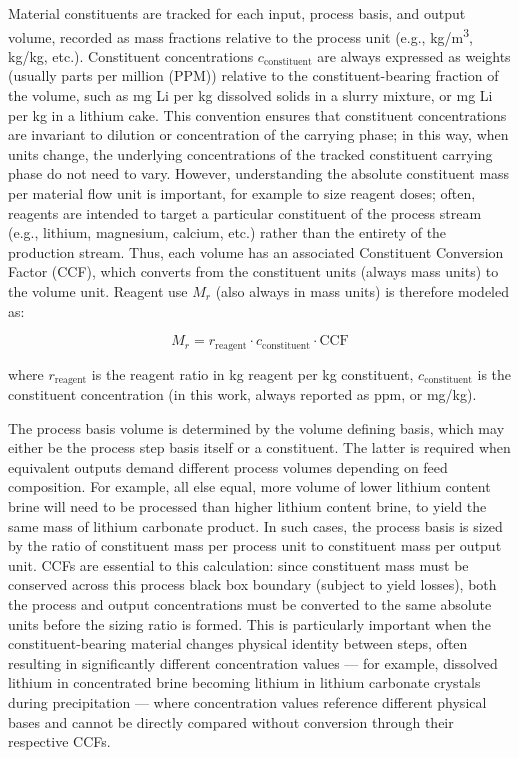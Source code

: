 Material constituents are tracked for each input, process basis, and output volume, recorded as mass fractions relative to the process unit (e.g., kg/m\textsuperscript{3}, kg/kg, etc.). Constituent concentrations $c_\text{constituent}$ are always expressed as weights (usually parts per million (PPM)) relative to the constituent-bearing fraction of the volume, such as mg Li per kg dissolved solids in a slurry mixture, or mg Li per kg  in a lithium cake. This convention ensures that constituent concentrations are invariant to dilution or concentration of the carrying phase; in this way, when units change, the underlying concentrations of the tracked constituent carrying phase do not need to vary. However, understanding the absolute constituent mass per material flow unit is important, for example to size reagent doses; often, reagents are intended to target a particular constituent of the process stream (e.g., lithium, magnesium, calcium, etc.) rather than the entirety of the production stream. Thus, each volume has an associated Constituent Conversion Factor (CCF), which converts from the constituent units (always mass units) to the volume unit. Reagent use $M_r$ (also always in mass units) is therefore modeled as:

\begin{equation}
    M_r = r_\text{reagent} \cdot c_\text{constituent} \cdot \text{CCF}
    \label{eq:c-reagentmass}
\end{equation}

where $r_\text{reagent}$ is the reagent ratio in kg reagent per kg constituent, $c_\text{constituent}$ is the constituent concentration (in this work, always reported as ppm, or mg/kg).

The process basis volume is determined by the volume defining basis, which may either be the process step basis itself or a constituent. The latter is required when equivalent outputs demand different process volumes depending on feed composition. For example, all else equal, more volume of lower lithium content brine will need to be processed than higher lithium content brine, to yield the same mass of lithium carbonate product. In such cases, the process basis is sized by the ratio of constituent mass per process unit to constituent mass per output unit. CCFs are essential to this calculation: since constituent mass must be conserved across this process black box boundary (subject to yield losses), both the process and output concentrations must be converted to the same absolute units before the sizing ratio is formed. This is particularly important when the constituent-bearing material changes physical identity between steps, often resulting in significantly different concentration values --- for example, dissolved lithium in concentrated brine becoming lithium in lithium carbonate crystals during precipitation --- where concentration values reference different physical bases and cannot be directly compared without conversion through their respective CCFs. 

